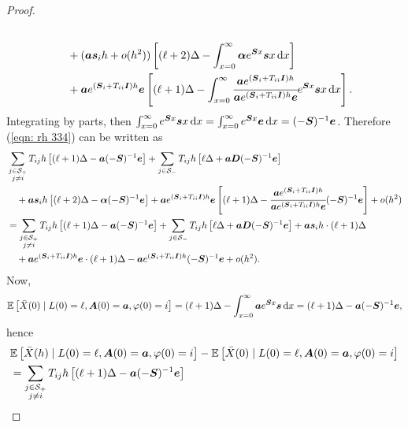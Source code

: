 \begin{proof}
\begin{align}
		\\&\qquad{} + (\boldsymbol a \boldsymbol s_i h + o(h^2)) \left[ (\ell+2)\Delta - \int_{x=0}^\infty \boldsymbol \alpha e^{\boldsymbol Sx}\boldsymbol s x \, \mathrm{d} x\right] \nonumber
		\\&\qquad{} + \boldsymbol a e^{(\boldsymbol S_i + T_{ii}\boldsymbol I)h}\boldsymbol e \left[ (\ell+1)\Delta - \int_{x=0}^\infty \cfrac{\boldsymbol a e^{(\boldsymbol S_i + T_{ii}\boldsymbol I)h}}{\boldsymbol a e^{(\boldsymbol S_i + T_{ii}\boldsymbol I)h} \boldsymbol e} e^{\boldsymbol Sx}\boldsymbol s x \, \mathrm{d} x\right]. \label{eqn: rh 334}
	\end{align}
	Integrating by parts, then \(\int_{x=0}^\infty e^{\boldsymbol Sx} \boldsymbol s x \, \mathrm{d} x = \int_{x=0}^\infty e^{\boldsymbol Sx} \boldsymbol e \, \mathrm{d} x = (-\boldsymbol S)^{-1}\boldsymbol e\). Therefore (\ref{eqn: rh 334}) can be written as 
	\begin{align}
		&\sum_{\substack{j\in\mathcal S_+\\j\neq i}}T_{ij}h \left[ (\ell+1)\Delta - \boldsymbol a (-\boldsymbol S)^{-1}\boldsymbol e \right] \nonumber 
		+ \sum_{j\in\mathcal S_-}T_{ij}h \left[ \ell\Delta + \boldsymbol a\boldsymbol D(-\boldsymbol S)^{-1}\boldsymbol e \right] \nonumber
		\\&\quad {} + \boldsymbol a \boldsymbol s_i h \left[ (\ell+2)\Delta - \boldsymbol \alpha (-\boldsymbol S)^{-1}\boldsymbol e \right] \nonumber
		+ \boldsymbol a e^{(\boldsymbol S_i + T_{ii}\boldsymbol I)h}\boldsymbol e \left[ (\ell+1)\Delta - \cfrac{\boldsymbol a e^{(\boldsymbol S_i + T_{ii}\boldsymbol I)h}}{\boldsymbol a e^{(\boldsymbol S_i + T_{ii}\boldsymbol I)h} \boldsymbol e} (-\boldsymbol S)^{-1}\boldsymbol e \right] + o(h^2)
		\\&= \sum_{\substack{j\in\mathcal S_+\\j\neq i}}T_{ij}h \left[ (\ell+1)\Delta - \boldsymbol a (-\boldsymbol S)^{-1}\boldsymbol e \right] \nonumber 
		+ \sum_{j\in\mathcal S_-}T_{ij}h \left[ \ell\Delta + \boldsymbol a\boldsymbol D(-\boldsymbol S)^{-1}\boldsymbol e \right] \nonumber
		+ \boldsymbol a \boldsymbol s_i h \cdot (\ell+1)\Delta  \nonumber
		\\&\quad {}+ \boldsymbol a e^{(\boldsymbol S_i + T_{ii}\boldsymbol I)h}\boldsymbol e \cdot (\ell+1)\Delta - \boldsymbol a e^{(\boldsymbol S_i + T_{ii}\boldsymbol I)h} (-\boldsymbol S)^{-1}\boldsymbol e + o(h^2).
	\end{align}
	Now, 
	\[\mathbb E\left [\bar X(0)\mid L(0)= \ell,\boldsymbol A(0)=\boldsymbol a,\varphi(0)=i\right] =(\ell+1)\Delta - \int_{x=0}^\infty \boldsymbol a e^{\boldsymbol Sx} \boldsymbol s\, \mathrm{d} x = (\ell+1)\Delta - \boldsymbol a (-\boldsymbol S)^{-1}\boldsymbol e,\]
	hence 
	\begin{align}
		&\mathbb E\left[\bar X(h)\mid L(0)=\ell,\bs A(0)=\bs a,\varphi(0)=i\right] - \mathbb E\left [\bar X(0)\mid L(0)=\ell,\bs A(0)=\bs a,\varphi(0)=i\right] \nonumber 
		\\&= \sum_{\substack{j\in\mathcal S_+\\j\neq i}}T_{ij}h \left[ (\ell+1)\Delta - \bs a (-\bs S)^{-1}\bs e \right] \nonumber 

\end{align}
\end{proof}
